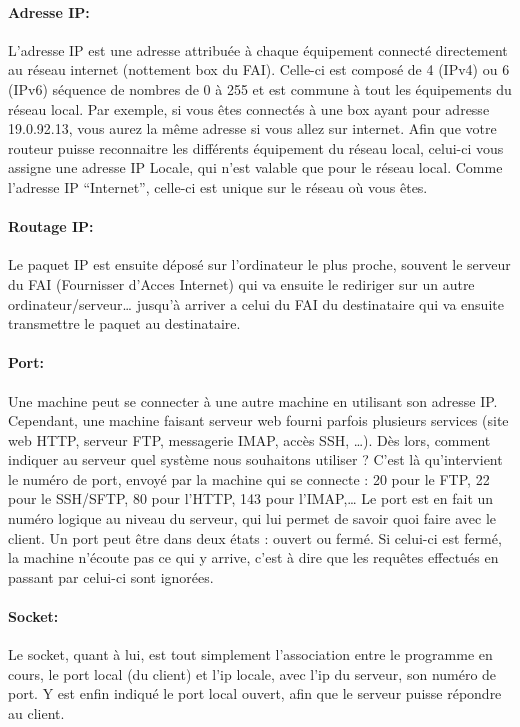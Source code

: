 \documentclass[12pt,a4paper,twoside]{article}
\begin{document}
    \paragraph*{Adresse IP:\\}
    L'adresse IP est une adresse attribuée à chaque équipement connecté directement au réseau internet (nottement box du FAI). Celle-ci est composé de 4 (IPv4) ou 6 (IPv6) séquence de nombres de 0 à 255 et est commune à tout les équipements du réseau local.
    Par exemple, si vous êtes connectés à une box ayant pour adresse 19.0.92.13, vous aurez la même adresse si vous allez sur internet. Afin que votre routeur puisse reconnaitre les différents équipement du réseau local, celui-ci vous assigne une adresse IP Locale, qui n'est valable que pour le réseau local. Comme l'adresse IP ``Internet'', celle-ci est unique sur le réseau où vous êtes.

    \paragraph*{Routage IP:\\}
    Le paquet IP est ensuite déposé sur l'ordinateur le plus proche, souvent le serveur du FAI (Fournisser d'Acces Internet) qui va ensuite le rediriger sur un autre ordinateur/serveur\ldots{} jusqu'à arriver a celui du FAI du destinataire qui va ensuite transmettre le paquet au destinataire.

    \paragraph*{Port:\\}
    Une machine peut se connecter à une autre machine en utilisant son adresse IP. Cependant, une machine faisant serveur web fourni parfois plusieurs services (site web HTTP, serveur FTP, messagerie IMAP, accès SSH, …). Dès lors, comment indiquer au serveur quel système nous souhaitons utiliser ? C'est là qu'intervient le numéro de port, envoyé par la machine qui se connecte : 20 pour le FTP, 22 pour le SSH/SFTP, 80 pour l'HTTP, 143 pour l'IMAP,\ldots{} Le port est en fait un numéro logique au niveau du serveur, qui lui permet de savoir quoi faire avec le client. Un port peut être dans deux états : ouvert ou fermé. Si celui-ci est fermé, la machine n'écoute pas ce qui y arrive, c'est à dire que les requêtes effectués en passant par celui-ci sont ignorées.

    \paragraph*{Socket:\\}
    Le socket, quant à lui, est tout simplement l'association entre le programme en cours, le port local (du client) et l'ip locale, avec l'ip du serveur, son numéro de port. Y est enfin indiqué le port local ouvert, afin que le serveur puisse répondre au client.
\end{document}
